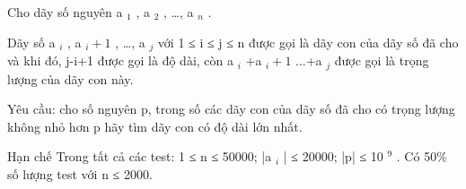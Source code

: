Cho dãy số nguyên a   $_    1   $   , a   $_    2   $   , …, a   $_    n   $   .  

   Dãy số a   $_    i   $   , a   $_    i+1   $   , …, a   $_    j   $   với 1 ≤ i ≤ j ≤ n được gọi là dãy con của dãy số đã cho và khi đó, j-i+1 được gọi là độ dài, còn   a   $_    i   $   +a   $_    i+1   $   ...+a   $_    j   $   được gọi là trọng lượng của dãy con này.  

   Yêu cầu: cho số nguyên p, trong số các dãy con của dãy số đã cho có trọng lượng không nhỏ hơn p hãy tìm dãy con có độ dài lớn nhất.  

Hạn chế
Trong tất cả các test: 1 ≤ n ≤ 50000;  |a   $_    i   $   | ≤ 20000; |p| ≤ 10   $^    9   $   . Có 50\% số lượng test với n ≤ 2000.